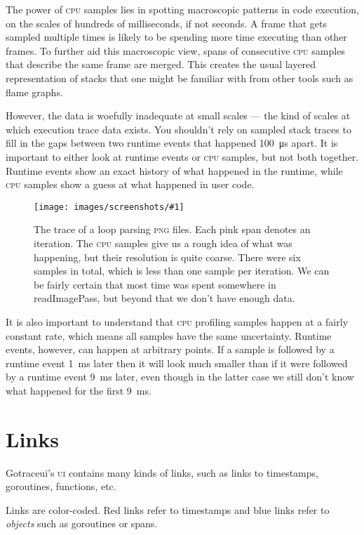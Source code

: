 \documentclass[10pt,letterpaper,oneside,openany,english]{memoir}
\newcommand{\code}[1]{{\ttfamily\mbox{#1}}}
\newcommand{\noun}[1]{{\emph{#1}}}
\newcommand{\screenshot}[2]{%
\begin{figure}[!ht]
  \centering
  \texttt{[image: images/screenshots/\#1]}
  \caption{#2}
\end{figure}}
\begin{document}
The power of \textsc{cpu} samples lies in spotting macroscopic patterns in code execution, on the scales of hundreds of milliseconds, if not seconds.
A frame that gets sampled multiple times is likely to be spending more time executing than other frames.
To further aid this macroscopic view, spans of consecutive \textsc{cpu} samples that describe the same frame are merged.
This creates the usual layered representation of stacks that one might be familiar with from other tools such as flame graphs.

However, the data is woefully inadequate at small scales --- the kind of scales at which execution trace data exists.
You shouldn't rely on sampled stack traces to fill in the gaps between two runtime events that happened \qty{100}{\micro\second} apart.
It is important to either look at runtime events or \textsc{cpu} samples, but not both together.
Runtime events show an exact history of what happened in the runtime, while \textsc{cpu} samples show a guess at what happened in user code.

\screenshot{sampling.png}{%
  The trace of a loop parsing \textsc{png} files.
  Each pink span denotes an iteration.
  The \textsc{cpu} samples give us a rough idea of what was happening, but their resolution is quite coarse.
  There were six samples in total, which is less than one sample per iteration.
  We can be fairly certain that most time was spent somewhere in \code{readImagePass}, but beyond that we don't have enough data.
}

It is also important to understand that \textsc{cpu} profiling samples happen at a fairly constant rate, which means all samples have the same uncertainty.
Runtime events, however, can happen at arbitrary points.
If a sample is followed by a runtime event \qty{1}{\milli\second} later then it will look much smaller than if it were followed by a runtime event \qty{9}{\milli\second} later,
even though in the latter case we still don't know what happened for the first \qty{9}{\milli\second}.

\section{Links}

Gotraceui's \textsc{ui} contains many kinds of links, such as links to timestamps, goroutines, functions, etc.

Links are color-coded. Red links refer to timestamps and blue links refer to \noun{objects} such as goroutines or spans.
\end{document}
